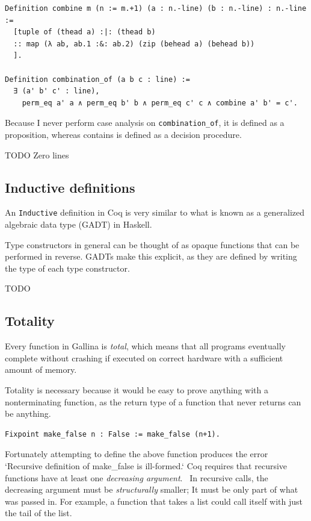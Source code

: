 \documentclass[english, 12pt, a4paper, sci, a-1b, online]{aaltothesis}
\newcommand\icoq[1]{\texttt{#1}}
\begin{document}
\begin{verbatim}
Definition combine m (n := m.+1) (a : n.-line) (b : n.-line) : n.-line :=
  [tuple of (thead a) :|: (thead b)
  :: map (λ ab, ab.1 :&: ab.2) (zip (behead a) (behead b))
  ].

Definition combination_of (a b c : line) :=
  ∃ (a' b' c' : line),
    perm_eq a' a ∧ perm_eq b' b ∧ perm_eq c' c ∧ combine a' b' = c'.
\end{verbatim}

Because I never perform case analysis on \icoq{combination_of}, it is defined as a proposition, whereas contains is defined as a decision procedure.

TODO Zero lines

\subsection{Inductive definitions}

An \icoq{Inductive} definition in Coq is very similar to what is known as a generalized algebraic data type (GADT) in Haskell.

Type constructors in general can be thought of as opaque functions that can be performed in reverse. GADTs make this explicit, as they are defined by writing the type of each type constructor.

TODO

\subsection{Totality}\label{totality}

Every function in Gallina is \emph{total}, which means that all programs eventually complete without crashing if executed on correct hardware with a sufficient amount of memory.

Totality is necessary because it would be easy to prove anything with a nonterminating function, as the return type of a function that never returns can be anything.
\begin{verbatim}
Fixpoint make_false n : False := make_false (n+1).
\end{verbatim}
Fortunately attempting to define the above function produces the error `Recursive definition of make\_false is ill-formed.` Coq requires that recursive functions have at least one \emph{decreasing argument}.~\cite{coqRefman} In recursive calls, the decreasing argument must be \emph{structurally} smaller; It must be only part of what was passed in. For example, a function that takes a list could call itself with just the tail of the list.
\end{document}
